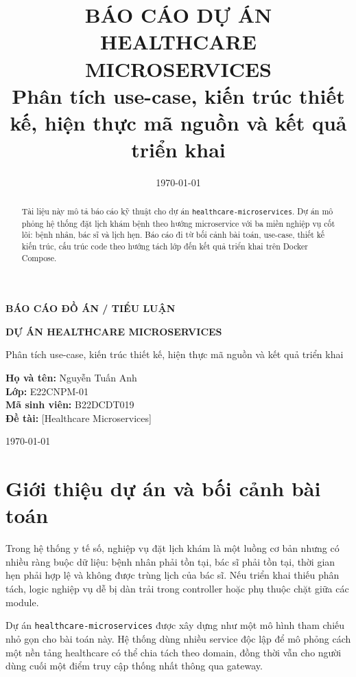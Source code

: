 \documentclass[12pt,a4paper]{article}
\title{\textbf{BÁO CÁO DỰ ÁN HEALTHCARE MICROSERVICES}\\[4pt]
\large Phân tích use-case, kiến trúc thiết kế, hiện thực mã nguồn và kết quả triển khai}
\author{}
\date{\today}
\begin{document}
\begin{titlepage}
    \centering
    {\Large \textbf{BÁO CÁO ĐỒ ÁN / TIỂU LUẬN}\par}
    \vspace{1.5cm}
    {\LARGE \textbf{DỰ ÁN HEALTHCARE MICROSERVICES}\par}
    \vspace{0.8cm}
    {\large Phân tích use-case, kiến trúc thiết kế, hiện thực mã nguồn và kết quả triển khai\par}
    \vfill
    \begin{flushleft}
        \textbf{Họ và tên:} Nguyễn Tuấn Anh\\[0.4cm]
        \textbf{Lớp:} E22CNPM-01\\[0.4cm]
        \textbf{Mã sinh viên:} B22DCDT019\\[0.4cm]
        \textbf{Đề tài:} [Healthcare Microservices]
    \end{flushleft}
    \vfill
    {\large \today\par}
\end{titlepage}

\maketitle
\thispagestyle{fancy}

\begin{abstract}
Tài liệu này mô tả báo cáo kỹ thuật cho dự án \texttt{healthcare-microservices}. Dự án mô phỏng hệ thống đặt lịch khám bệnh theo hướng microservice với ba miền nghiệp vụ cốt lõi: bệnh nhân, bác sĩ và lịch hẹn. Báo cáo đi từ bối cảnh bài toán, use-case, thiết kế kiến trúc, cấu trúc code theo hướng tách lớp đến kết quả triển khai trên Docker Compose.
\end{abstract}

\section{Giới thiệu dự án và bối cảnh bài toán}
Trong hệ thống y tế số, nghiệp vụ đặt lịch khám là một luồng cơ bản nhưng có nhiều ràng buộc dữ liệu: bệnh nhân phải tồn tại, bác sĩ phải tồn tại, thời gian hẹn phải hợp lệ và không được trùng lịch của bác sĩ. Nếu triển khai thiếu phân tách, logic nghiệp vụ dễ bị dàn trải trong controller hoặc phụ thuộc chặt giữa các module.

Dự án \texttt{healthcare-microservices} được xây dựng như một mô hình tham chiếu nhỏ gọn cho bài toán này. Hệ thống dùng nhiều service độc lập để mô phỏng cách một nền tảng healthcare có thể chia tách theo domain, đồng thời vẫn cho người dùng cuối một điểm truy cập thống nhất thông qua gateway.
\end{document}
